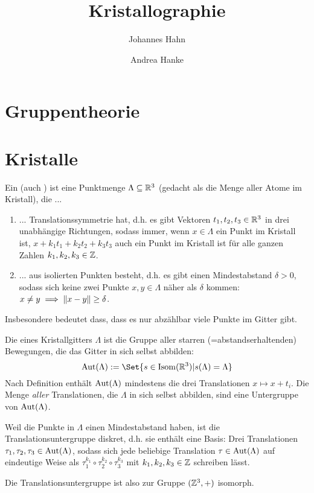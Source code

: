 \documentclass[fontsize=11pt,fleqn,a4paper]{scrartcl}
\title{Kristallographie}
\author{Johannes Hahn \and Andrea Hanke}
\begin{document}
\maketitle

\section{Gruppentheorie}

\section{Kristalle}

\begin{definition}[Kristalle]
Ein  (auch ) ist eine Punktmenge $\Lambda\subseteq\mathbb{R}^3$ (gedacht als die Menge aller Atome im Kristall), die ...
\begin{enumerate}
\item ... Translationssymmetrie hat, d.h. es gibt Vektoren $t_1,t_2,t_3\in\mathbb{R}^3$ in drei unabhängige Richtungen, sodass immer, wenn $x\in\Lambda$ ein Punkt im Kristall ist, $x+k_1 t_1+k_2t_2+k_3t_3$ auch ein Punkt im Kristall ist für alle ganzen Zahlen $k_1,k_2,k_3\in\mathbb{Z}$.
\item ... aus isolierten Punkten besteht, d.h. es gibt einen Mindestabstand $\delta>0$, sodass sich keine zwei Punkte $x,y\in\Lambda$ näher als $\delta$ kommen: $x\neq y \implies\lVert x-y\rVert\geq\delta$.
\end{enumerate}
\end{definition}

\begin{remark}
Insbesondere bedeutet dass, dass es nur abzählbar viele Punkte im Gitter gibt.
\end{remark}

\begin{definition}
Die  eines Kristallgitters $\Lambda$ ist die Gruppe aller starren (=abstandserhaltenden) Bewegungen, die das Gitter in sich selbst abbilden:
\[\Aut(\Lambda) := \Set{s\in \operatorname{Isom}(\IR^3) | s(\Lambda)=\Lambda}\]
Nach Definition enthält $\operatorname{Aut}(\Lambda)$ mindestens die drei Translationen $x\mapsto x+t_i$. Die Menge \emph{aller} Translationen, die $\Lambda$ in sich selbst abbilden, sind eine Untergruppe von $\operatorname{Aut}(\Lambda)$.
\end{definition}

\begin{remark}
Weil die Punkte in $\Lambda$ einen Mindestabstand haben, ist die Translationsuntergruppe diskret, d.h. sie enthält eine Basis: Drei Translationen $\tau_1,\tau_2,\tau_3\in\operatorname{Aut}(\Lambda)$, sodass sich jede beliebige Translation $\tau\in\operatorname{Aut}(\Lambda)$ auf eindeutige Weise als $\tau_1^{k_1}\circ\tau_2^{k_2} \circ \tau_3^{k_3}$ mit $k_1,k_2,k_3\in\mathbb{Z}$ schreiben lässt.

Die Translationsuntergruppe ist also zur Gruppe $(\mathbb{Z}^3,+)$ isomorph.
\end{remark}
\end{document}
